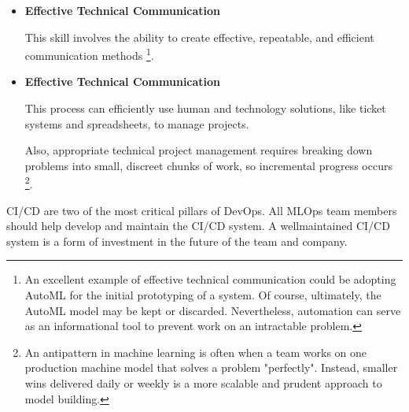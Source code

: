 \begin{itemize}
    \item \textbf{Effective Technical Communication}
    
    \noindent
    This skill involves the ability to create effective,
    repeatable, and efficient communication methods
    \footnote{
        An excellent example of effective technical communication
        could be adopting AutoML for the initial prototyping of a
        system. Of course, ultimately, the AutoML model may be
        kept or discarded. Nevertheless, automation can serve as an
        informational tool to prevent work on an intractable
        problem.
    }.
    

    \item \textbf{Effective Technical Communication}
    
    \noindent
    This process can efficiently use human and technology
    solutions, like ticket systems and spreadsheets,
    to manage projects.

    Also, appropriate technical project management requires
    breaking down problems into small, discreet chunks of
    work, so incremental progress occurs
    \footnote{
        An antipattern in machine learning is often when a
        team works on one production machine model that
        solves a problem "perfectly". Instead, smaller wins
        delivered daily or weekly is a more scalable and
        prudent approach to model building.
    }.
    
\end{itemize}
CI/CD are two of the most critical pillars of DevOps. All MLOps
team members should help develop and maintain the CI/CD system.
A wellmaintained CI/CD system is a form of investment in the
future of the team and company.




